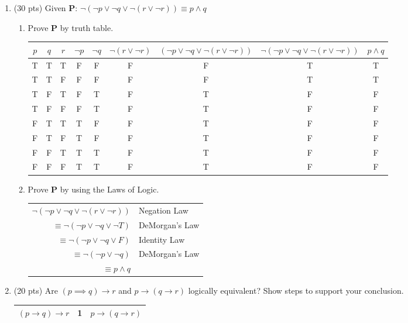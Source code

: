 \documentclass[11pt]{article}
\begin{document}
\begin{enumerate}
  \item (30 pts) Given {\bf P}: $\neg{( \neg{p} \vee \neg{q} \vee \neg{(r \vee \neg{r} )} )} \equiv p \wedge q$
  \begin{enumerate}
    \item Prove {\bf P} by truth table.
    
  \begin{tabular}{ | c | c | c | c | c | c | c | c | c | }
    \hline
    $p$ & $q$ & $r$ & $\neg p$ & $\neg q$ & $\neg (r \vee \neg r)$ & $( \neg p \vee \neg q \vee \neg (r \vee \neg r ) )$ & $\neg( \neg p \vee \neg q \vee \neg(r \vee \neg r))$ & $p \wedge q$\\
    \hline
    T & T & T & F & F & F & F & T & T \\  \hline
    T & T & F & F & F & F & F & T & T \\  \hline
    T & F & T & F & T & F & T & F & F \\  \hline
    T & F & F & F & T & F & T & F & F \\  \hline
    F & T & T & T & F & F & T & F & F \\  \hline
    F & T & F & T & F & F & T & F & F \\  \hline
    F & F & T & T & T & F & T & F & F \\  \hline
    F & F & F & T & T & F & T & F & F \\  \hline
    \end{tabular}
    \item Prove {\bf P} by using the Laws of Logic. \\
      \begin{tabular}{r l}
      $\neg (\neg p \vee \neg q \vee \neg(r \vee \neg r))$ & Negation Law \\
      $\equiv \neg(\neg p \vee \neg q \vee \neg T)$ & DeMorgan's Law \\
      $\equiv \neg(\neg p \vee \neg q \vee F)$ & Identity Law \\
      $\equiv \neg(\neg p \vee \neg q)$ & DeMorgan's Law \\
      $\equiv p \wedge q$\\
      \end{tabular}
  \end{enumerate}
    \item (20 pts) Are $(p\implies q) \rightarrow r$ and $p \rightarrow (q\rightarrow r)$ logically equivalent? Show steps to support your conclusion.\\
    \begin{tabular}{ r | c | l }
      $(p\rightarrow q) \rightarrow r$ & 1 & $p \rightarrow (q\rightarrow r)$ \\ \hline
      

\end{tabular}
\end{enumerate}
\end{document}
